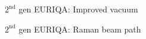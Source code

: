 \documentclass{beamer}
\begin{document}


\begin{frame}{$2^{\text{nd}}$ gen EURIQA: Improved vacuum}
  \begin{center}
    \begin{tikzpicture}
    \end{tikzpicture}
  \end{center}
\end{frame}



\begin{frame}{$2^{\text{nd}}$ gen EURIQA: Raman beam path}
  \begin{center}
    \begin{tikzpicture}
    \end{tikzpicture}
  \end{center}
\end{frame}

\end{document}
